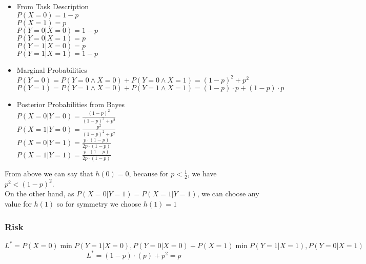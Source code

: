 \documentclass[11pt]{article}
\begin{document}
\begin{itemize}
    \item From Task Description \\
    $P(X=0) = 1-p$ \\
    $P(X=1) = p$ \\
    $P(Y=0 | X = 0) = 1-p$ \\
    $P(Y=0 | X=1) = p$ \\
    $P(Y=1 | X=0) = p$ \\
    $P(Y=1 | X=1) = 1-p$ 
    \item Marginal Probabilities \\
    $P(Y=0) = P(Y=0 \land X=0) + P(Y=0 \land X=1) = (1-p)^2 + p^2$ \\
    $P(Y=1) = P(Y=1 \land X=0) + P(Y=1 \land X=1) = (1-p)\cdot p + (1-p)\cdot p$ 
    \item Posterior Probabilities from Bayes \\
    $P(X=0 | Y=0) = \frac{(1-p)^2}{(1-p)^2 + p^2}$ \\
    $P(X=1 | Y=0) = \frac{p^2}{(1-p)^2 + p^2}$ \\
    $P(X=0 | Y=1) = \frac{p\cdot(1-p)}{2p\cdot(1-p)}$ \\
    $P(X=1 | Y=1) = \frac{p \cdot(1-p)}{2p\cdot(1-p)}$ 
\end{itemize}
From above we can say that $h(0) = 0$, because for $p < \frac{1}{2}$, we have $p^2 < (1-p)^2$. \\
On the other hand, as $P(X=0|Y=1) = P(X=1|Y=1)$, we can choose any value for $h(1)$ so for symmetry we choose $h(1) = 1$

\subsubsection*{Risk}
$$L^* = P(X=0) \min{P(Y=1 | X=0), P(Y=0|X=0)} + P(X=1)\min{P(Y=1|X=1), P(Y=0|X=1)}$$
$$L^* = (1-p)\cdot(p) + p^2 = p$$
\end{document}
